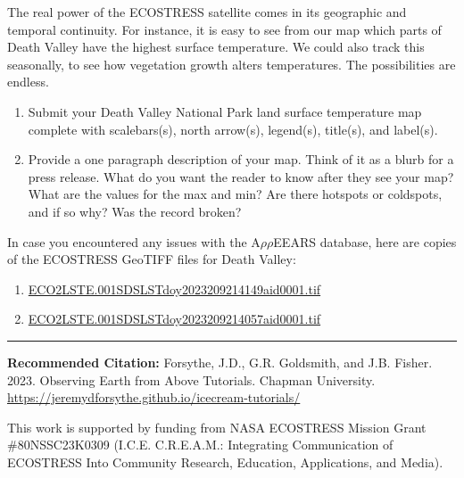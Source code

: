 \documentclass[oneside,a4paper,11pt,explicit]{book}
\begin{document}
The real power of the ECOSTRESS satellite comes in its geographic and temporal continuity. For instance, it is easy to see from our map which parts of Death Valley have the highest surface temperature. We could also track this seasonally, to see how vegetation growth alters temperatures. The possibilities are endless.

\begin{tcolorbox}[colback=yellow!5!white,colframe=IceCreamOrbit,title= \vspace{.2em} \Large Map of the Week Assignments]
	\large
	\begin{enumerate}
		\item Submit your Death Valley National Park land surface temperature map complete with scalebars(s), north arrow(s), legend(s), title(s), and label(s). 
        \item Provide a one paragraph description of your map. Think of it as a blurb for a press release. What do you want the reader to know after they see your map? What are the values for the max and min? Are there hotspots or coldspots, and if so why? Was the record broken?
	\end{enumerate}
\end{tcolorbox}

\begin{tcolorbox}[colback=yellow!5!white,title=\textbf{Datafiles}]
	\large
	In case you encountered any issues with the A$\rho\rho$EEARS database, here are copies of the ECOSTRESS GeoTIFF files for Death Valley:
	\begin{enumerate}
		\item \href{https://jeremydforsythe.github.io/icecream-tutorials/Tutorial3_AccessingRemoteSensingDataWithAppears/ECO2LSTE.001_SDS_LST_doy2023209214149_aid0001.tif}{\small ECO2LSTE.001\textunderscore SDS\textunderscore LST\textunderscore doy2023209214149\textunderscore aid0001.tif}
		\item \href{https://jeremydforsythe.github.io/icecream-tutorials/Tutorial3_AccessingRemoteSensingDataWithAppears/ECO2LSTE.001_SDS_LST_doy2023209214057_aid0001.tif}{\small ECO2LSTE.001\textunderscore SDS\textunderscore LST\textunderscore doy2023209214057\textunderscore aid0001.tif}
	\end{enumerate}
\end{tcolorbox}


\hrule

\vspace{1em}

\small \textbf{Recommended Citation:} Forsythe, J.D., G.R. Goldsmith, and J.B. Fisher. 2023. Observing Earth from Above Tutorials. Chapman University. \url{https://jeremydforsythe.github.io/icecream-tutorials/}

\vspace{1em}

This work is supported by funding from NASA ECOSTRESS Mission Grant \#80NSSC23K0309 (I.C.E. C.R.E.A.M.: Integrating Communication of ECOSTRESS Into Community Research, Education, Applications, and Media).
\end{document}
